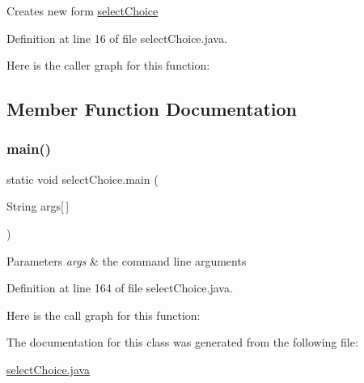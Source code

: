 Creates new form \mbox{\hyperlink{classselect_choice}{select\+Choice}} 

Definition at line 16 of file select\+Choice.\+java.

Here is the caller graph for this function\+:


\subsection{Member Function Documentation}
\mbox{\label{classselect_choice_a6c7bc3bed977cd4ced7f2cc59e2b3be1}} 
\subsubsection{\texorpdfstring{main()}{main()}}
{\footnotesize\ttfamily static void select\+Choice.\+main (\begin{DoxyParamCaption}\item[{String}]{args\mbox{[}$\,$\mbox{]} }\end{DoxyParamCaption})\hspace{0.3cm}{\ttfamily [static]}}


\begin{DoxyParams}{Parameters}
{\em args} & the command line arguments \\
\hline
\end{DoxyParams}


Definition at line 164 of file select\+Choice.\+java.

Here is the call graph for this function\+:


The documentation for this class was generated from the following file\+:\begin{DoxyCompactItemize}
\item 
\mbox{\hyperlink{select_choice_8java}{select\+Choice.\+java}}\end{DoxyCompactItemize}
